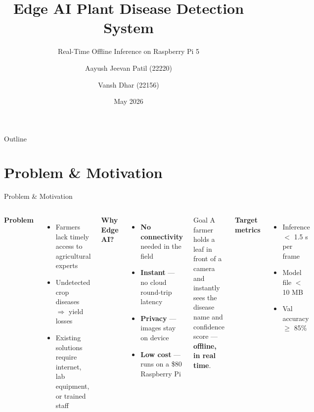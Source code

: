 \documentclass[aspectratio=169]{beamer}
\title[Edge AI Plant Disease Detection]{\textbf{Edge AI Plant Disease Detection System}}
\subtitle{Real-Time Offline Inference on Raspberry Pi 5}
\author{Aayush Jeevan Patil (22220) \and Vansh Dhar (22156)}
\institute{Edge AI Course}
\date{May 2026}
\begin{document}
\begin{frame}
  \titlepage
\end{frame}

\begin{frame}{Outline}
  \tableofcontents
\end{frame}

\section{Problem \& Motivation}

\begin{frame}{Problem \& Motivation}
  \begin{columns}
      \textbf{Problem}
      \begin{itemize}
        \item Farmers lack timely access to agricultural experts
        \item Undetected crop diseases $\Rightarrow$ yield losses
        \item Existing solutions require internet, lab equipment, or trained staff
      \end{itemize}
      \vspace{0.4cm}
      \textbf{Why Edge AI?}
      \begin{itemize}
        \item \textcolor{leafgreen}{\textbf{No connectivity}} needed in the field
        \item \textcolor{leafgreen}{\textbf{Instant}} — no cloud round-trip latency
        \item \textcolor{leafgreen}{\textbf{Privacy}} — images stay on device
        \item \textcolor{leafgreen}{\textbf{Low cost}} — runs on a \$80 Raspberry Pi
      \end{itemize}
      \begin{block}{Goal}
        A farmer holds a leaf in front of a camera and instantly sees the disease name and confidence score — \textbf{offline, in real time}.
      \end{block}
      \vspace{0.3cm}
      \textbf{Target metrics}
      \begin{itemize}
        \item Inference $<$ 1.5 s per frame
        \item Model file $<$ 10 MB
        \item Val accuracy $\geq$ 85\%
      \end{itemize}
  \end{columns}
\end{frame}
\end{document}
